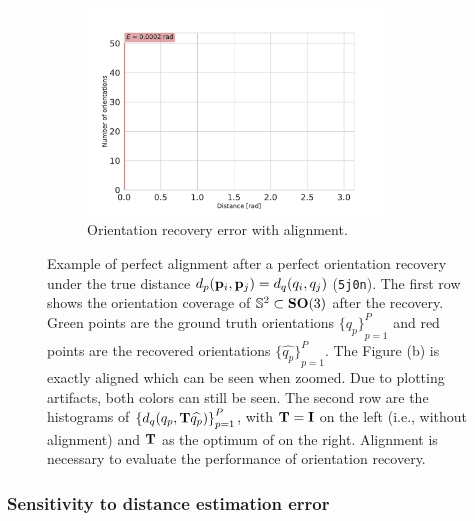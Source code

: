 \begin{figure}[ht!]
\begin{subfigure}[b]{0.45\textwidth}
    \end{subfigure}
    \hfill
    \begin{subfigure}[b]{0.5\textwidth}
    \centering
        \includegraphics[height=5.5cm]{figures/5j0n_perfect_angle_ralignment_after}
        \caption{Orientation recovery error with alignment.}
    \end{subfigure}
    \caption{%
        Example of perfect alignment after a perfect orientation recovery under the true distance $d_p(\mathbf{p}_i, \mathbf{p}_j) = d_q(q_i, q_j)$ (\texttt{5j0n}).
        The first row shows the orientation coverage of $\mathbb{S}^2 \subset \mathrm{\mathbf{SO}}(3)$ after the recovery.
        Green points are the ground truth orientations ${\{q_p\}}_{p=1}^P$ and red points are the recovered orientations ${\{\widehat{q_p}\}}_{p=1}^P$. The Figure (b) is exactly aligned which can be seen when zoomed. Due to plotting artifacts, both colors can still be seen. 
        The second row are the histograms of ${\{ d_q (q_p, \mathbf{T} \widehat{q_p}) \}}_{p=1}^P$, with $\mathbf{T} = \mathbf{I}$ on the left (i.e., without alignment) and $\mathbf{T}$ as the optimum of  on the right.
        Alignment is necessary to evaluate the performance of orientation recovery.
    }\label{fig:5j0n-aa-loss-perfect-distances}
\end{figure}


\subsubsection{Sensitivity to distance estimation error}\label{sec:results:orientation-recovery:sensitivity}


